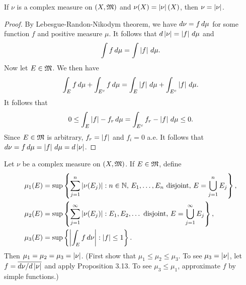 \documentclass[a4paper]{article}
\begin{document}
\begin{ex}[Folland 3.20]
If $\nu$ is a complex measure on $(X, \mathfrak{M})$ and 
$\nu(X) = \left\lvert \nu\right\rvert(X)$, then $\nu = \left\lvert \nu\right\rvert$.
\end{ex}

\begin{proof}
By Lebesgue-Randon-Nikodym theorem, we have 
$d \nu = f \, d \mu$ for some function $f$ and positive 
measure $\mu$. It follows that $d \left\lvert \nu\right\rvert 
= \left\lvert f\right\rvert \, d \mu$ and 
\[
\int f \, d \mu = \int \left\lvert f\right\rvert \, d \mu.
\]
Now let $E \in \mathfrak{M}$. We then have 
\[
\int_E f \, d \mu + \int_{E^c} f \, d \mu = 
\int_E \left\lvert f\right\rvert \, d \mu + \int_{E^c} \left\lvert f\right\rvert \, d \mu.
\]
It follows that 
\[
0 \leq \int_{E} \left\lvert f\right\rvert - f_r \, d \mu
= \int_{E^c} f_r - \left\lvert f\right\rvert \, d \mu \leq 0.
\]
Since $E \in \mathfrak{M}$ is arbitrary, 
$f_r = \left\lvert f\right\rvert$ and $f_i = 0$ a.e. It follows that 
$d \nu = f \, d \mu = \left\lvert f\right\rvert \, d \mu = d \left\lvert \nu\right\rvert$.
\end{proof}

\begin{ex}[Folland 3.21]
Let $\nu$ be a complex measure on $(X, \mathfrak{M})$. If $E \in \mathfrak{M}$, 
define 
\[
\begin{aligned}
\mu_1 (E) 
&= \sup \left\{ \sum_{j=1}^n \left\lvert \nu(E_j)\right\rvert : \text{$n \in \mathbb{N}$, 
$E_1, \dots, E_n$ disjoint, $E = \bigcup_{j=1}^n E_j$} \right\}, \\
\mu_2 (E) 
&= \sup \left\{ \sum_{j=1}^\infty \left\lvert \nu(E_j)\right\rvert : 
\text{$E_1, E_2, \dots$ disjoint, $E = \bigcup_{j=1}^\infty E_j$} \right\}, \\
\mu_3 (E) 
&= \sup \left\{ \left\lvert \int_E f \, d \nu\right\rvert : \left\lvert f\right\rvert \leq 1 \right\}.
\end{aligned}
\]
Then $\mu_1 = \mu_2 = \mu_3 = \left\lvert \nu\right\rvert$. (First show that 
$\mu_1 \leq \mu_2 \leq \mu_3$. To see $\mu_3 = \left\lvert \nu\right\rvert$, 
let $f = \overline{d \nu / d \left\lvert \nu\right\rvert}$ and apply Proposition 3.13. 
To see $\mu_3 \leq \mu_1$, approximate $f$ by simple functions.)
\end{ex}
\end{document}
